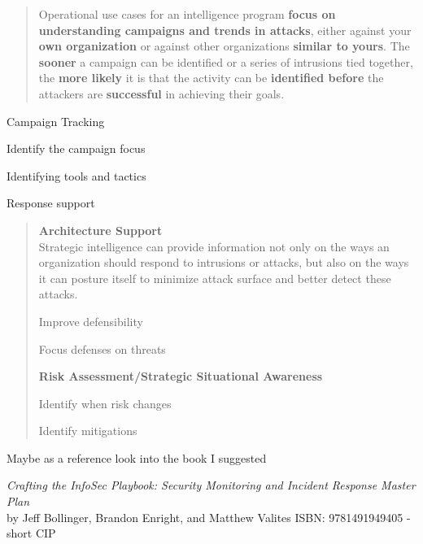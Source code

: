\documentclass[Screen16to9,17pt]{foils}
\begin{document}


\begin{quote}
Operational use cases for an intelligence program {\bf focus on understanding campaigns and trends in attacks}, either against your {\bf own organization} or against other organizations {\bf similar to yours}. The {\bf sooner} a campaign can be identified or a series of intrusions tied together, the {\bf more likely} it is that the activity can be {\bf identified before} the attackers are {\bf successful} in achieving their goals.
\end{quote}

\begin{list2}
\item Campaign Tracking
\item Identify the campaign focus
\item Identifying tools and tactics
\item Response support
\end{list2}



\begin{quote}
{\bf Architecture Support}\\
Strategic intelligence can provide information not only on the ways an organization
should respond to intrusions or attacks, but also on the ways it can posture itself to
minimize attack surface and better detect these attacks.
\begin{list2}
\item Improve defensibility
\item Focus defenses on threats
\end{list2}

{\bf Risk Assessment/Strategic Situational Awareness}\\
\begin{list2}
\item Identify when risk changes
\item Identify mitigations
\end{list2}
\end{quote}


Maybe as a reference look into the book I suggested


\emph{Crafting the InfoSec Playbook: Security Monitoring and Incident Response Master Plan}\\
 by Jeff Bollinger, Brandon Enright, and Matthew Valites ISBN: 9781491949405 - short CIP
\end{document}
